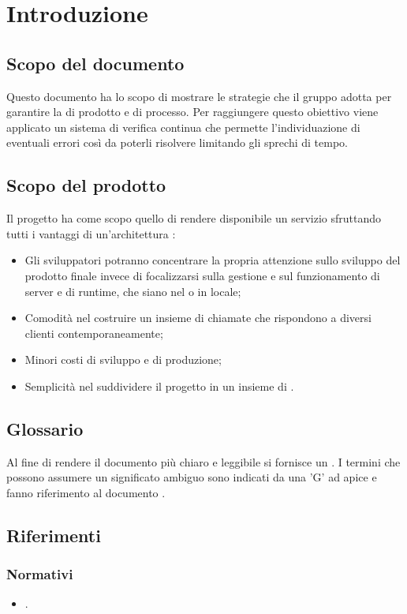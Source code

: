 \section{Introduzione}
\label{introduzione}
\subsection{Scopo del documento}
Questo documento ha lo scopo di mostrare le strategie che il gruppo {\Gruppo} adotta per garantire la  di prodotto e di processo. Per raggiungere questo obiettivo viene applicato un sistema di verifica continua che permette l'individuazione di eventuali errori così da poterli risolvere limitando gli sprechi di tempo.
\subsection{Scopo del prodotto} 
Il progetto {\NomeProgetto} ha come scopo quello di rendere disponibile un servizio  sfruttando tutti i vantaggi di un'architettura :
\begin{itemize}
	\item Gli sviluppatori potranno concentrare la propria attenzione sullo sviluppo del prodotto finale invece di focalizzarsi sulla gestione e sul funzionamento di server e di runtime, che siano nel  o in locale;
	\item Comodità nel costruire un insieme di chiamate  che rispondono a diversi clienti contemporaneamente;
	\item Minori costi di sviluppo e di produzione;
	\item Semplicità nel suddividere il progetto in un insieme di .
\end{itemize}
\subsection{Glossario}
Al fine di rendere il documento più chiaro e leggibile si fornisce un \Glossario. I termini che possono assumere un significato ambiguo sono indicati da una 'G' ad apice e fanno riferimento al documento .
\subsection{Riferimenti}
\subsubsection{Normativi}
\begin{itemize}
	\item {}.
\end{itemize}
